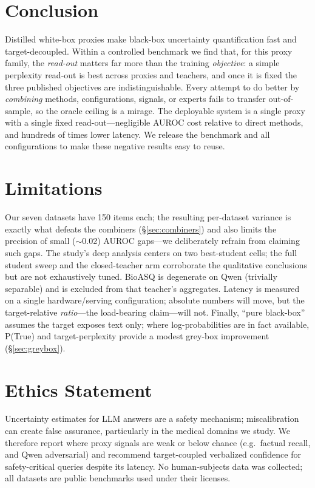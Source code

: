 \documentclass[11pt]{article}
\begin{document}
\section{Conclusion}
Distilled white-box proxies make black-box uncertainty quantification fast and
target-decoupled. Within a controlled benchmark we find that, for this proxy family, the
\emph{read-out} matters far more than the training \emph{objective}: a simple perplexity
read-out is best across proxies and teachers, and once it is fixed the three published
objectives are indistinguishable. Every attempt to do better by \emph{combining}
methods, configurations, signals, or experts fails to transfer out-of-sample, so the
oracle ceiling is a mirage. The deployable system is a single proxy with a
single fixed read-out---negligible AUROC cost relative to direct methods, and hundreds
of times lower latency. We release the benchmark and all configurations to make these
negative results easy to reuse.

\section*{Limitations}
Our seven datasets have 150 items each; the resulting per-dataset variance is exactly
what defeats the combiners (\S\ref{sec:combiners}) and also limits the precision of
small ($\sim$0.02) AUROC gaps---we deliberately refrain from claiming such gaps. The
study's deep analysis centers on two best-student cells; the full student sweep and the
closed-teacher arm corroborate the qualitative conclusions but are not exhaustively
tuned. BioASQ is degenerate on Qwen (trivially separable) and is excluded from that
teacher's aggregates. Latency is measured on a single hardware/serving configuration;
absolute numbers will move, but the target-relative \emph{ratio}---the load-bearing
claim---will not. Finally, ``pure black-box'' assumes the target exposes text only; where
log-probabilities are in fact available, P(True) and target-perplexity provide a modest
grey-box improvement (\S\ref{sec:greybox}).

\section*{Ethics Statement}
Uncertainty estimates for LLM answers are a safety mechanism; miscalibration can create
false assurance, particularly in the medical domains we study. We therefore report where
proxy signals are weak or below chance (e.g.\ factual recall, and Qwen adversarial) and
recommend target-coupled verbalized confidence for safety-critical queries despite its
latency. No human-subjects data was collected; all datasets are public benchmarks used
under their licenses.
\end{document}
